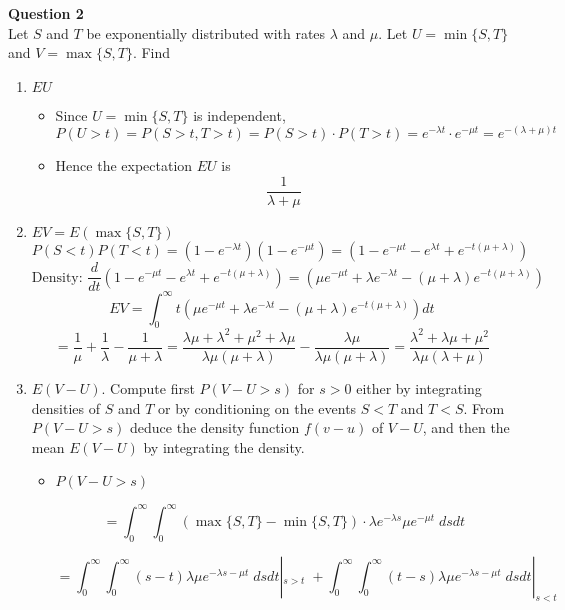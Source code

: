 \documentclass[12pt]{article}
\begin{document}
\newpage
\textbf{Question 2}\\
Let $S$ and $T$ be exponentially distributed with rates $\lambda$ and $\mu$. Let $U= \min\{S,T\}$ and $V=\max\{S,T\}$. Find
\begin{enumerate}[label=(\alph*)]
    \item $EU$
    \begin{itemize}
        \item Since $U=\min\{S,T\}$ is independent, 
        $$P(U>t) = P(S>t,T>t) = P(S>t)\cdot P(T>t) =e^{-\lambda t}\cdot e^{-\mu t} = e^{-(\lambda+\mu) t}$$
        
        \item Hence the expectation $EU$ is
        $$\frac{1}{\lambda+\mu}$$
        
        
    \end{itemize}
    \item $EV=E(\max\{S,T\})$
    $$P(S<t)P(T<t)= (1-e^{-\lambda t})(1-e^{-\mu t})=(1-e^{-\mu t}-e^{\lambda t}+e^{-t(\mu+\lambda)}) $$
    $$\text{Density: }\frac{d}{dt}(1-e^{-\mu t}-e^{\lambda t}+e^{-t(\mu+\lambda)}) 
    = \left(\mu e^{-\mu t} +\lambda e^{-\lambda t} - (\mu+\lambda) e^{-t(\mu+\lambda)}\right)$$
    $$EV = \int_0^\infty t\left(\mu e^{-\mu t} +\lambda e^{-\lambda t} - (\mu+\lambda) e^{-t(\mu+\lambda)}\right)dt $$
    $$=\frac{1}{\mu}+\frac{1}{\lambda}-\frac{1}{\mu+\lambda}=\frac{\lambda\mu+\lambda^2+\mu^2+\lambda\mu}{\lambda\mu(\mu+\lambda)}-\frac{\lambda\mu}{\lambda\mu(\mu+\lambda)} = \frac{\lambda^2+\lambda\mu+\mu^2}{\lambda\mu(\lambda+\mu)}    $$
    
    \item $E(V-U)$. Compute first $P(V-U > s)$ for $s>0$ either by integrating densities of $S$ and $T$ or by conditioning on the events $S<T$ and $T<S$. From $P(V-U>s)$ deduce the density function $f(v-u)$ of $V-U$, and then the mean $E(V-U)$ by integrating the density.
    
    \begin{itemize}
            \item $P(V-U>s)$
            
            $$=\int_0^\infty \int_0^\infty (\max\{S,T\}-\min\{S,T\})\cdot \lambda e^{-\lambda s}\mu e^{-\mu t}\;dsdt$$        
            
            $$=\int_0^\infty \int_0^\infty (s-t)\lambda \mu e^{-\lambda s -\mu t} \;dsdt \left|_{ s>t }\; 
            + \int_0^\infty \int_0^\infty (t-s) \lambda\mu e^{-\lambda s -\mu t}\;dsdt\right|_{s<t}$$
            

\end{itemize}
\end{enumerate}
\end{document}
